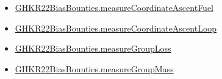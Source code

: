 \documentclass[10pt]{article}
\begin{document}
\begin{itemize}
\item \hyperlink{governing-declaration-70e0db053feab450}{GHKR22\allowbreak{}Bias\allowbreak{}Bounties.\allowbreak{}measure\allowbreak{}Coordinate\allowbreak{}Ascent\allowbreak{}Fuel}
\item \hyperlink{paper-prerequisite-227de2fce26afc75}{GHKR22\allowbreak{}Bias\allowbreak{}Bounties.\allowbreak{}measure\allowbreak{}Coordinate\allowbreak{}Ascent\allowbreak{}Loop}
\item \hyperlink{paper-prerequisite-c9cff6ba9100bf1c}{GHKR22\allowbreak{}Bias\allowbreak{}Bounties.\allowbreak{}measure\allowbreak{}Group\allowbreak{}Loss}
\item \hyperlink{paper-prerequisite-ac1a5a161f2dd3f6}{GHKR22\allowbreak{}Bias\allowbreak{}Bounties.\allowbreak{}measure\allowbreak{}Group\allowbreak{}Mass}
\end{itemize}
\end{document}

